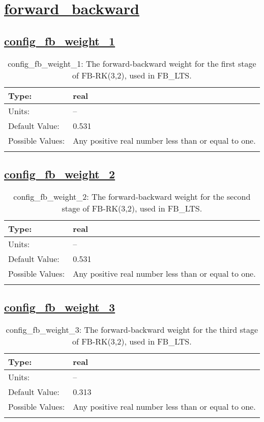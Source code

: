 \section[forward\_backward]{\hyperref[sec:nm_tab_forward_backward]{forward\_backward}}
\label{sec:nm_sec_forward_backward}
\subsection[config\_fb\_weight\_1]{\hyperref[sec:nm_tab_forward_backward]{config\_fb\_weight\_1}}
\label{subsec:nm_sec_config_fb_weight_1}
\begin{center}
\begin{longtable}{| p{2.0in} || p{4.0in} |}
    \hline
    Type: & real \\
    \hline
    Units: & -- \\
    \hline
    Default Value: & 0.531 \\
    \hline
    Possible Values: & Any positive real number less than or equal to one. \\
    \hline
    \caption{config\_fb\_weight\_1: The forward-backward weight for the first stage of FB-RK(3,2), used in FB\_LTS.}
\end{longtable}
\end{center}
\subsection[config\_fb\_weight\_2]{\hyperref[sec:nm_tab_forward_backward]{config\_fb\_weight\_2}}
\label{subsec:nm_sec_config_fb_weight_2}
\begin{center}
\begin{longtable}{| p{2.0in} || p{4.0in} |}
    \hline
    Type: & real \\
    \hline
    Units: & -- \\
    \hline
    Default Value: & 0.531 \\
    \hline
    Possible Values: & Any positive real number less than or equal to one. \\
    \hline
    \caption{config\_fb\_weight\_2: The forward-backward weight for the second stage of FB-RK(3,2), used in FB\_LTS.}
\end{longtable}
\end{center}
\subsection[config\_fb\_weight\_3]{\hyperref[sec:nm_tab_forward_backward]{config\_fb\_weight\_3}}
\label{subsec:nm_sec_config_fb_weight_3}
\begin{center}
\begin{longtable}{| p{2.0in} || p{4.0in} |}
    \hline
    Type: & real \\
    \hline
    Units: & -- \\
    \hline
    Default Value: & 0.313 \\
    \hline
    Possible Values: & Any positive real number less than or equal to one. \\
    \hline
    \caption{config\_fb\_weight\_3: The forward-backward weight for the third stage of FB-RK(3,2), used in FB\_LTS.}
\end{longtable}
\end{center}
